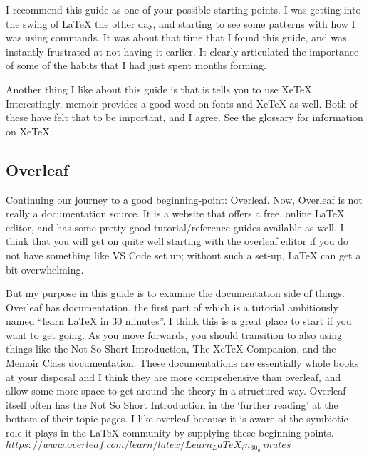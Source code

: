 \documentclass[12pt, oneside]{memoir}
\begin{document}
I recommend this guide as one of your possible starting points. I was getting into the swing of \LaTeX{} the other day, and starting to see some patterns with how I was using commands. It was about that time that I found this guide, and was instantly frustrated at not having it earlier. It clearly articulated the importance of some of the habits that I had just spent months forming.

Another thing I like about this guide is that is tells you to use XeTeX. Interestingly, memoir provides a good word on fonts and XeTeX as well. Both of these have felt that to be important, and I agree. See the glossary for information on XeTeX.

\subsection{Overleaf}

Continuing our journey to a good beginning-point: Overleaf. Now, Overleaf is not really a documentation source. It is a website that offers a free, online \LaTeX{} editor, and has some pretty good tutorial/reference-guides available as well. I think that you will get on quite well starting with the overleaf editor if you do not have something like VS Code set up; without such a set-up, \LaTeX{} can get a bit overwhelming.

But my purpose in this guide is to examine the documentation side of things. Overleaf has documentation, the first part of which is a tutorial ambitiously named ``learn \LaTeX{} in 30 minutes''. I think this is a great place to start if you want to get going. As you move forwards, you should transition to also using things like the Not So Short Introduction, The XeTeX Companion, and the Memoir Class documentation. These documentations are essentially whole books at your disposal and I think they are more comprehensive than overleaf, and allow some more space to get around the theory in a structured way. Overleaf itself often has the Not So Short Introduction in the `further reading' at the bottom of their topic pages. I like overleaf because it is aware of the symbiotic role it plays in the \LaTeX{} community by supplying these beginning points.\\

$https://www.overleaf.com/learn/latex/Learn_LaTeX_in_30_minutes$
\end{document}
